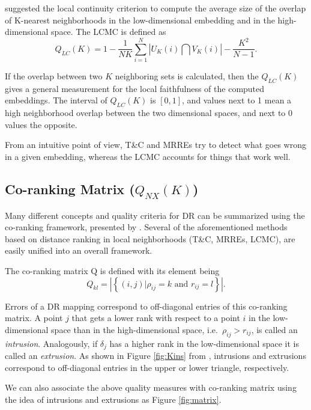\documentclass[11pt,a4paper,]{article}
\begin{document}
\textcite{Chen2009-su} suggested the local continuity criterion to compute the average size of the overlap of K-nearest neighborhoods in the low-dimensional embedding and in the high-dimensional space. The LCMC is defined as
\[
Q_{LC}(K)=1-\frac{1}{N K} \sum_{i=1}^{N}\left| U_K(i) \bigcap V_K(i) \right|-\frac{K^{2}}{N-1}.
\]

If the overlap between two \(K\) neighboring sets is calculated, then the \(Q_{LC}(K)\) gives a general measurement for the local faithfulness of the computed embeddings. The interval of \(Q_{LC}(K)\) is \([0,1]\), and values next to 1 mean a high neighborhood overlap between the two dimensional spaces, and next to 0 values the opposite.

From an intuitive point of view, T\&C and MRREs try to detect what goes wrong in a given embedding, whereas the LCMC accounts for things that work well.

\hypertarget{co-ranking-matrix-q_nxk}{%
\subsection{\texorpdfstring{Co-ranking Matrix (\(Q_{NX}(K)\))}{Co-ranking Matrix (Q\_\{NX\}(K))}}\label{co-ranking-matrix-q_nxk}}

Many different concepts and quality criteria for DR can be summarized using the co-ranking framework, presented by \textcite{Lee2008-cx}. Several of the aforementioned methods based on distance ranking in local neighborhoods (T\&C, MRREs, LCMC), are easily unified into an overall framework.

The co-ranking matrix \(\mathrm{Q}\) is defined with its element being
\[
Q_{kl}=\left|\left\{(i, j) | \rho_{i j}=k \text { and } r_{i j}=l\right\}\right|.
\]

Errors of a DR mapping correspond to off-diagonal entries of this co-ranking matrix.
A point \(j\) that gets a lower rank with respect to a point \(i\) in the low-dimensional space than in the
high-dimensional space, i.e.~\(\rho_{ij} > r_{ij}\), is called an \emph{intrusion}. Analogously, if \(\delta_j\) has a higher rank in the low-dimensional space it is called an \emph{extrusion}. As shown in Figure \ref{fig:Kins} from \textcite{Lee2008-cx}, intrusions and extrusions correspond to off-diagonal entries in the upper or lower triangle, respectively.

We can also associate the above quality measures with co-ranking matrix using the idea of intrusions and extrusions as Figure \ref{fig:matrix}.
\end{document}
